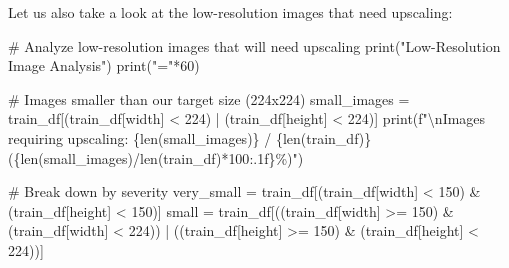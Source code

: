 \documentclass[
  letterpaper,
  DIV=11,
  numbers=noendperiod]{scrartcl}
\newenvironment{Shaded}{\begin{snugshade}}{\end{snugshade}}
\newcommand{\BuiltInTok}[1]{\textcolor[rgb]{0.00,0.23,0.31}{#1}}
\newcommand{\CharTok}[1]{\textcolor[rgb]{0.13,0.47,0.30}{#1}}
\newcommand{\CommentTok}[1]{\textcolor[rgb]{0.37,0.37,0.37}{#1}}
\newcommand{\DecValTok}[1]{\textcolor[rgb]{0.68,0.00,0.00}{#1}}
\newcommand{\NormalTok}[1]{\textcolor[rgb]{0.00,0.23,0.31}{#1}}
\newcommand{\OperatorTok}[1]{\textcolor[rgb]{0.37,0.37,0.37}{#1}}
\newcommand{\SpecialCharTok}[1]{\textcolor[rgb]{0.37,0.37,0.37}{#1}}
\newcommand{\SpecialStringTok}[1]{\textcolor[rgb]{0.13,0.47,0.30}{#1}}
\newcommand{\StringTok}[1]{\textcolor[rgb]{0.13,0.47,0.30}{#1}}
\renewenvironment{Shaded}{%
  \begin{tcolorbox}[%
    enhanced,%
    colback=codebg,%
    colframe=codebg,%
    borderline west={3pt}{0pt}{sectionblue},%
    boxrule=0pt,%
    arc=0pt,%
    boxsep=5pt,%
    left=2mm,%
    right=2mm,%
    top=2mm,%
    bottom=2mm%
  ]%
}{%
  \end{tcolorbox}%
}
\begin{document}
Let us also take a look at the low-resolution images that need
upscaling:

\begin{Shaded}
\begin{Highlighting}[]
\CommentTok{\# Analyze low{-}resolution images that will need upscaling}
\BuiltInTok{print}\NormalTok{(}\StringTok{"Low{-}Resolution Image Analysis"}\NormalTok{)}
\BuiltInTok{print}\NormalTok{(}\StringTok{"="}\OperatorTok{*}\DecValTok{60}\NormalTok{)}

\CommentTok{\# Images smaller than our target size (224x224)}
\NormalTok{small\_images }\OperatorTok{=}\NormalTok{ train\_df[(train\_df[}\StringTok{\textquotesingle{}width\textquotesingle{}}\NormalTok{] }\OperatorTok{\textless{}} \DecValTok{224}\NormalTok{) }\OperatorTok{|}\NormalTok{ (train\_df[}\StringTok{\textquotesingle{}height\textquotesingle{}}\NormalTok{] }\OperatorTok{\textless{}} \DecValTok{224}\NormalTok{)]}
\BuiltInTok{print}\NormalTok{(}\SpecialStringTok{f"}\CharTok{\textbackslash{}n}\SpecialStringTok{Images requiring upscaling: }\SpecialCharTok{\{}\BuiltInTok{len}\NormalTok{(small\_images)}\SpecialCharTok{\}}\SpecialStringTok{ / }\SpecialCharTok{\{}\BuiltInTok{len}\NormalTok{(train\_df)}\SpecialCharTok{\}}\SpecialStringTok{ (}\SpecialCharTok{\{}\BuiltInTok{len}\NormalTok{(small\_images)}\OperatorTok{/}\BuiltInTok{len}\NormalTok{(train\_df)}\OperatorTok{*}\DecValTok{100}\SpecialCharTok{:.1f\}}\SpecialStringTok{\%)"}\NormalTok{)}

\CommentTok{\# Break down by severity}
\NormalTok{very\_small }\OperatorTok{=}\NormalTok{ train\_df[(train\_df[}\StringTok{\textquotesingle{}width\textquotesingle{}}\NormalTok{] }\OperatorTok{\textless{}} \DecValTok{150}\NormalTok{) }\OperatorTok{\&}\NormalTok{ (train\_df[}\StringTok{\textquotesingle{}height\textquotesingle{}}\NormalTok{] }\OperatorTok{\textless{}} \DecValTok{150}\NormalTok{)]}
\NormalTok{small }\OperatorTok{=}\NormalTok{ train\_df[((train\_df[}\StringTok{\textquotesingle{}width\textquotesingle{}}\NormalTok{] }\OperatorTok{\textgreater{}=} \DecValTok{150}\NormalTok{) }\OperatorTok{\&}\NormalTok{ (train\_df[}\StringTok{\textquotesingle{}width\textquotesingle{}}\NormalTok{] }\OperatorTok{\textless{}} \DecValTok{224}\NormalTok{)) }\OperatorTok{|} 
\NormalTok{                 ((train\_df[}\StringTok{\textquotesingle{}height\textquotesingle{}}\NormalTok{] }\OperatorTok{\textgreater{}=} \DecValTok{150}\NormalTok{) }\OperatorTok{\&}\NormalTok{ (train\_df[}\StringTok{\textquotesingle{}height\textquotesingle{}}\NormalTok{] }\OperatorTok{\textless{}} \DecValTok{224}\NormalTok{))]}


\end{Highlighting}
\end{Shaded}
\end{document}
